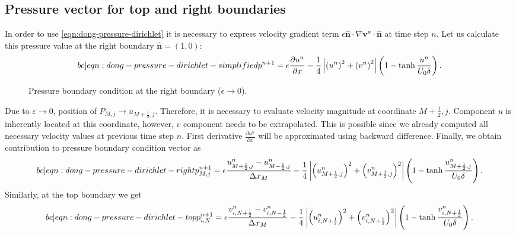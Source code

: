 \documentclass{article}
\numberwithin{equation}{section}
\begin{document}
\subsection{Pressure vector for top and right boundaries}
In order to use \cref{eqn:dong-pressure-dirichlet} it is necessary to express velocity gradient term $\epsilon \boldsymbol{\hat{n}} \cdot \nabla \boldsymbol{v}^n \cdot \boldsymbol{\hat{n}}$ at time step $n$. 
Let us calculate this pressure value at the right boundary $\boldsymbol{\hat{n}}=\left( 1, 0 \right)$:
\begin{equation}\label[bc]{eqn:dong-pressure-dirichlet-simplified}
	p^{n+1}=\epsilon \frac{\partial u^n}{\partial x}-\frac{1}{4}\left|\left({u}^n\right)^2+\left({v}^n\right)^2\right| \left(1-\operatorname{tanh}\frac{u^n}{U_0\delta}\right).
\end{equation}
\begin{figure}[H] %
  \caption{Pressure boundary condition at the right boundary ($\epsilon\to 0$).}\label{fig:luxx-bottom}
\end{figure}
Due to $\varepsilon\to 0$, position of $P_{M,j}\to u_{M+\frac{1}{2},j}$. Therefore, it is necessary to evaluate velocity magnitude at coordinate $M+\frac{1}{2},j$. Component $u$ is inherently located at this coordinate, however, $v$ component needs to be extrapolated. This is possible since we already computed all necessary velocity values at previous time step $n$. First derivative $\frac{\partial u^n}{\partial x}$ will be approximated using backward difference. Finally, we obtain contribution to pressure boundary condition vector as
\begin{equation}\label[bc]{eqn:dong-pressure-dirichlet-right}
	p^{n+1}_{M,j}=\epsilon \frac{u^n_{M+\frac{1}{2},j}-u^n_{M-\frac{1}{2},j}}{\Delta x_M}-\frac{1}{4}\left|\left({u}_{M+\frac{1}{2},j}^n\right)^2+\left({v}_{M+\frac{1}{2},j}^n\right)^2\right| \left(1-\operatorname{tanh}\frac{u_{M+\frac{1}{2},j}^n}{U_0\delta}\right).
\end{equation}
Similarly, at the top boundary we get
\begin{equation}\label[bc]{eqn:dong-pressure-dirichlet-top}
	p^{n+1}_{i,N}=\epsilon \frac{v^n_{i,N+\frac{1}{2}}-v^n_{i,N-\frac{1}{2}}}{\Delta x_M}-\frac{1}{4}\left|\left({u}_{i,N+\frac{1}{2}}^n\right)^2+\left({v}_{i,N+\frac{1}{2}}^n\right)^2\right| \left(1-\operatorname{tanh}\frac{v_{i,N+\frac{1}{2}}^n}{U_0\delta}\right).
\end{equation}
\end{document}
